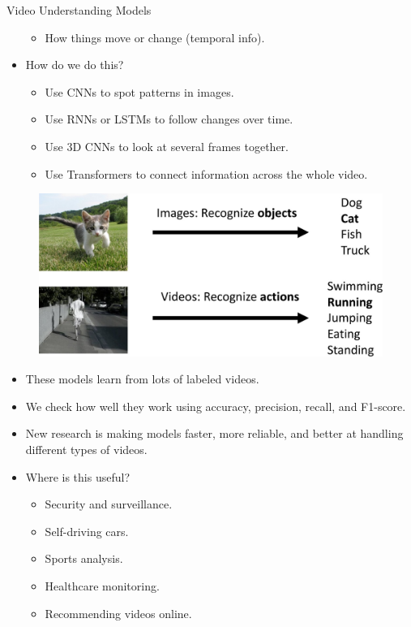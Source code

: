 \begin{frame}[allowframebreaks]{Video Understanding Models}
\begin{itemize}
\begin{itemize}
            \item How things move or change (temporal info).
        \end{itemize}
        \item How do we do this?
        \begin{itemize}
            \item Use CNNs to spot patterns in images.
            \item Use RNNs or LSTMs to follow changes over time.
            \item Use 3D CNNs to look at several frames together.
            \item Use Transformers to connect information across the whole video.
        \end{itemize}
    \end{itemize}
\framebreak
    \begin{figure}
        \centering
        \includegraphics[width=1\textwidth,height=0.9\textheight,keepaspectratio]{images/video/slide_5_1_img.jpg}
    \end{figure}
\framebreak
    \begin{itemize}
        \item These models learn from lots of labeled videos.
        \item We check how well they work using accuracy, precision, recall, and F1-score.
        \item New research is making models faster, more reliable, and better at handling different types of videos.
        \item Where is this useful?
        \begin{itemize}
            \item Security and surveillance.
            \item Self-driving cars.
            \item Sports analysis.
            \item Healthcare monitoring.
            \item Recommending videos online.
        \end{itemize}
    \end{itemize}
\end{frame}







